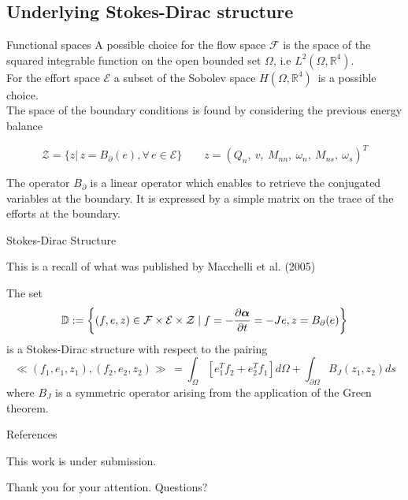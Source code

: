 \documentclass{beamer}
\begin{document}
\subsection{Underlying Stokes-Dirac structure} 
\begin{frame}{Functional spaces}
A possible choice for the flow space $\mathcal{F}$ is the space of the squared integrable function on the open bounded set $\Omega$, i.e $L^2(\Omega, \mathbb{R}^4)$. \\
\vspace{5mm}
For the effort space $\mathcal{E}$ a subset of the Sobolev space $H(\Omega, \mathbb{R}^4) \,$ is a possible choice. \\
\vspace{5mm}
The space of the boundary conditions is found by considering the previous energy balance 

\begin{equation*}
\mathcal{Z} = \{z | \, z = B_{\partial}(e), \forall \, e \in \mathcal{E} \}  \qquad z = \left(Q_n,\ v,\ M_{nn},\ \omega_n,\ M_{ns},\ \omega_s \right)^T 
\end{equation*}

The operator $B_{\partial}$ is a linear operator which enables to retrieve the conjugated variables at the boundary. It is expressed by a simple matrix on the trace of the efforts at the boundary. 

\end{frame}

\begin{frame}{Stokes-Dirac Structure}

This is a recall of what was published by Macchelli et al. (2005)
\begin{theorem}
	The set
	\begin{equation*}
	\mathbb{D} := \left\{ (f,e,z) \in \mathcal{F}\times\mathcal{E}\times\mathcal{Z} \; | \; f= - \diffp{\bm{\alpha}}{t} = -Je, z= B_{\partial}(e) \right\}
	\end{equation*} 
	is a Stokes-Dirac structure with respect to the pairing
	\begin{equation*}
	\ll (f_1, e_1, z_1), (f_2, e_2, z_2) \gg  \,= \int_{\Omega} \left[ e_1^T f_2 + e_2^T f_1 \right] d\Omega  + \int_{\partial \Omega} B_J(z_1, z_2) ds
	\end{equation*}
	where $B_J$ is a symmetric operator arising from the application of the Green theorem.
\end{theorem}
\end{frame}

\begin{frame}[allowframebreaks]{References}

\nocite{*}

\end{frame}

\begin{frame}
\centering
This work is under submission. \\

\vspace{2cm}

Thank you for your attention. Questions?
\end{frame}
\end{document}

